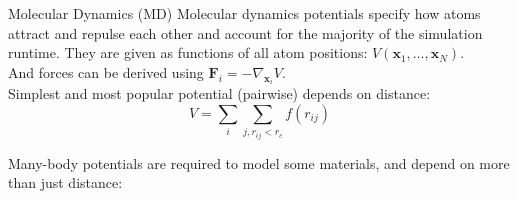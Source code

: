 \begin{frame}[fragile]{}
%
\vspace*{-0.5cm}%
\begin{columns}[onlytextwidth]%
%
\begin{column}{26.02cm}%
%
%
\begin{block}{Molecular Dynamics (MD)}%
Molecular dynamics potentials specify how atoms attract and repulse each other and account for the majority of the simulation runtime.
They are given as functions of all atom positions:
\hfill $V(\mathbf{x}_1, \dots, \mathbf{x}_N)$.\\
And forces can be derived using
\hfill $\mathbf{F}_i = -\nabla_{\mathbf{x}_i} V$.\\
Simplest and most popular potential (pairwise) depends on distance:
$$V=\sum_i\sum_{j, r_{ij} < r_c} f(r_{ij})$$

Many-body potentials are required to model some materials, and depend on more than just distance:


\end{block}
\end{column}
\end{columns}
\end{frame}
